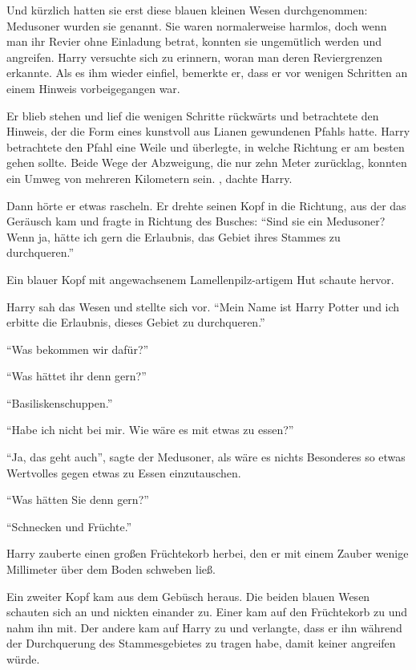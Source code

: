 Und kürzlich hatten sie erst diese blauen kleinen Wesen durchgenommen: Medusoner wurden sie genannt. Sie waren normalerweise harmlos, doch wenn man ihr Revier ohne Einladung betrat, konnten sie ungemütlich werden und angreifen. Harry versuchte sich zu erinnern, woran man deren Reviergrenzen erkannte. Als es ihm wieder einfiel, bemerkte er, dass er vor wenigen Schritten an einem Hinweis vorbeigegangen war.

Er blieb stehen und lief die wenigen Schritte rückwärts und betrachtete den Hinweis, der die Form eines kunstvoll aus Lianen gewundenen Pfahls hatte. Harry betrachtete den Pfahl eine Weile und überlegte, in welche Richtung er am besten gehen sollte. Beide Wege der Abzweigung, die nur zehn Meter zurücklag, konnten ein Umweg von mehreren Kilometern sein. , dachte Harry.

Dann hörte er etwas rascheln. Er drehte seinen Kopf in die Richtung, aus der das Geräusch kam und fragte in Richtung des Busches: \enquote{Sind sie ein Medusoner? Wenn ja, hätte ich gern die Erlaubnis, das Gebiet ihres Stammes zu durchqueren.}

Ein blauer Kopf mit angewachsenem Lamellenpilz-artigem Hut schaute hervor.

Harry sah das Wesen und stellte sich vor. \enquote{Mein Name ist Harry Potter und ich erbitte die Erlaubnis, dieses Gebiet zu durchqueren.}

\enquote{Was bekommen wir dafür?}

\enquote{Was hättet ihr denn gern?}

\enquote{Basiliskenschuppen.}

\enquote{Habe ich nicht bei mir. Wie wäre es mit etwas zu essen?}

\enquote{Ja, das geht auch}, sagte der Medusoner, als wäre es nichts Besonderes so etwas Wertvolles gegen etwas zu Essen einzutauschen.

\enquote{Was hätten Sie denn gern?}

\enquote{Schnecken und Früchte.}

Harry zauberte einen großen Früchtekorb herbei, den er mit einem Zauber wenige Millimeter über dem Boden schweben ließ.

Ein zweiter Kopf kam aus dem Gebüsch heraus. Die beiden blauen Wesen schauten sich an und nickten einander zu. Einer kam auf den Früchtekorb zu und nahm ihn mit. Der andere kam auf Harry zu und verlangte, dass er ihn während der Durchquerung des Stammesgebietes zu tragen habe, damit keiner angreifen würde.

